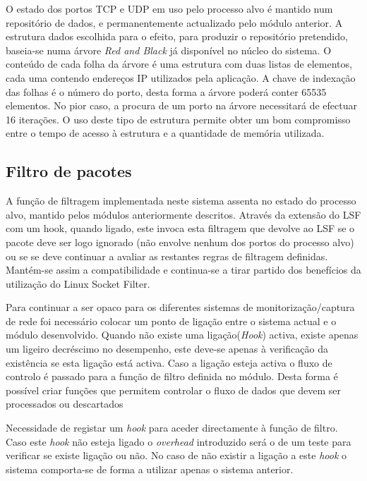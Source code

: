 O estado dos portos TCP e UDP em uso pelo processo alvo é mantido num repositório de dados, e permanentemente actualizado pelo módulo anterior. 
 A estrutura dados escolhida para o efeito, para produzir o repositório pretendido, baseia-se numa árvore \textit{Red and Black} já disponível no núcleo do sistema. O conteúdo de cada folha da árvore é uma estrutura com duas listas de elementos, cada uma contendo endereços IP utilizados pela aplicação. A chave de indexação das folhas é o número do porto, desta forma a árvore poderá conter 65535 elementos. No pior caso, a procura de um porto na árvore necessitará de efectuar 16 iterações.
  O uso deste tipo de estrutura permite obter um bom compromisso entre o tempo de acesso à estrutura e a quantidade de memória utilizada.


\subsection{Filtro de pacotes}
\label{sub:packet_filter}

A função de filtragem  implementada neste sistema assenta no estado do processo alvo, mantido pelos módulos anteriormente descritos.
Através da extensão do LSF com um hook, quando ligado, este invoca esta filtragem que devolve ao LSF se o pacote deve ser logo ignorado (não envolve nenhum dos portos do processo alvo) ou se se deve continuar a avaliar as restantes regras de filtragem definidas.
 Mantém-se assim a compatibilidade e continua-se a tirar partido dos benefícios da utilização do Linux Socket Filter.

Para continuar a ser opaco para os diferentes sistemas de monitorização/captura de rede foi necessário colocar um ponto de ligação entre o sistema actual e o módulo desenvolvido.
 Quando não existe uma ligação(\textit{Hook}) activa, existe apenas um ligeiro decréscimo no desempenho, este deve-se apenas à verificação da existência se esta ligação está activa.
 Caso a ligação esteja activa o fluxo de controlo é passado para a função de filtro definida no módulo.
 Desta forma é possível criar funções que permitem controlar o fluxo de dados que devem ser processados ou descartados

Necessidade de registar um \textit{hook} para aceder directamente à função de filtro.
 Caso este \textit{hook} não esteja ligado o \textit{overhead} introduzido será o de um teste para verificar se existe ligação ou não.
 No caso de não existir a ligação a este \textit{hook} o sistema comporta-se de forma a utilizar apenas o sistema anterior.

